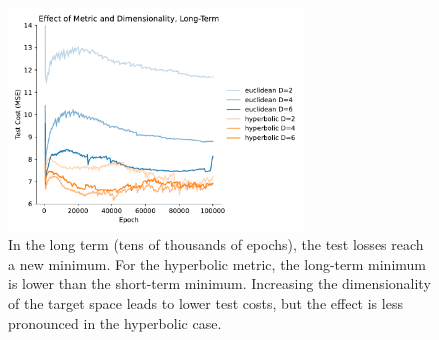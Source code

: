 \documentclass{article}
\begin{document}
\begin{figure}[H]
  \centering
  \includegraphics[width=0.7\textwidth]{figures/metric_and_dimensionality_long_term.pdf}
  \caption{In the long term (tens of thousands of epochs), the test losses reach a new minimum. For the hyperbolic metric, the long-term minimum is lower than the short-term minimum. Increasing the dimensionality of the target space leads to lower test costs, but the effect is less pronounced in the hyperbolic case.}
  \label{fig:metric-and-dimensionality-long-term}
\end{figure}
\end{document}

